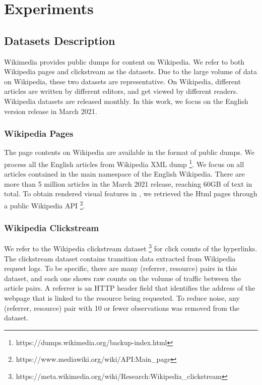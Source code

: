 \section{Experiments}

\subsection{Datasets Description}

Wikimedia provides public dumps for content on Wikipedia. We refer to both Wikipedia pages and clickstream as the datasets. Due to the large volume of data on Wikipedia, these two datasets are representative. On Wikipedia, different articles are written by different editors, and get viewed by different readers. Wikipedia datasets are released monthly. In this work, we focus on the English version release in March 2021.

\subsubsection {Wikipedia Pages}

The page contents on Wikipedia are available in the format of public dumps. We process all the English articles from Wikipedia XML dump \footnote{https://dumps.wikimedia.org/backup-index.html}. We focus on all articles contained in the main namespace of the English Wikipedia. There are more than 5 million articles in the March 2021 release, reaching 60GB of text in total. To obtain rendered visual features in \cite{dimitrov2017makes}, we retrieved the Html pages through a public Wikipedia API \footnote{https://www.mediawiki.org/wiki/API:Main\_page}.

\subsubsection{Wikipedia Clickstream}

We refer to the Wikipedia clickstream dataset \footnote{https://meta.wikimedia.org/wiki/Research:Wikipedia\_clickstream} for click counts of the hyperlinks. The clickstream dataset contains transition data extracted from Wikipedia request logs. To be specific, there are many (referrer, resource) pairs in this dataset, and each one shows raw counts on the volume of traffic between the article pairs. A referrer is an HTTP header field that identifies the address of the webpage that is linked to the resource being requested. To reduce noise, any (referrer, resource) pair with 10 or fewer observations was removed from the dataset.

